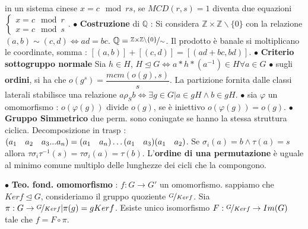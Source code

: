 \documentclass[1pt, letterpaper]{article}
\newcommand{\Z}{{\mathbb Z}}
\newcommand{\spaz}{{\text{\hphantom{aa}}}}
\newcommand{\norm}{{\unlhd}}
\newcommand{\fdot}{{\(\bullet\) }}
\begin{document}
in un sistema cinese \(x=c \mod rs\), se \(MCD(r,s)=1\) diventa due equazioni \(\begin{cases}
    x=c\mod r\\x=c\mod s
   \end{cases}\).
   \fdot \textbf{Costruzione} di \(\mathbb{Q}\) : Si considera \(\Z\times \Z\backslash \{0\}\) con la relazione \((a,b)\sim(c,d)\iff ad=bc\). \(\mathbb{Q}=\nicefrac{\Z\times \Z\backslash \{0\}}{\sim}\). Il prodotto è banale 
   si moltiplicano le coordinate, somma : \([(a,b)]+[(c,d)]=[(ad+bc,bd)]\). \fdot \color{red}\textbf{Criterio sottogruppo normale} \color{black} Sia \(h\in H\), \(H\norm G\iff a*h*(a^{-1})\in H \forall a\in G\) \fdot sugli \textbf{ordini},
   si ha che \(o(g^s)=\dfrac{mcm(o(g),s)}{s}\). La partizione fornita dalle classi laterali stabilisce una relazione \(a\rho_S b\iff \exists g\in G|a\in gH\land b\in gH\). 
   \fdot sia \(\varphi\) un omomorfismo : \(o(\varphi(g)) \) divide \(o(g)\), se è iniettivo  \(o(\varphi(g))=o(g)\). 
   \fdot \textbf{Gruppo Simmetrico} due perm. sono coniugate se hanno la stessa struttura ciclica. Decomposizione in trasp : \((a_1\spaz a_2\spaz a_3...a_n)=(a_1\spaz a_n)\dots(a_1\spaz a_3)(a_1\spaz a_2)\).
   Se \(\sigma_i(a)=b\land \tau(a)=s\) allora \(\tau\sigma_i\tau^{-1}(s)=\tau\sigma_i(a)=\tau(b)\). L'\textbf{ordine di una permutazione}
   è uguale al minimo comune multiplo delle lunghezze dei cicli che la compongono.
   
   \fdot \textbf{Teo. fond. omomorfismo} : \(f:G\rightarrow G'\) un omomorfismo. sappiamo che \(Kerf\norm G\), consideriamo il gruppo quoziente \(\nicefrac{G}{Kerf}\). Sia \(\pi :G\rightarrow \nicefrac{G}{Kerf}|
   \pi(g)=gKerf\). Esiste unico isomorfismo \(F:\nicefrac{G}{Kerf}\rightarrow Im(G)\) tale che \(f=F\circ \pi\). 
   
   
   
\end{document}
